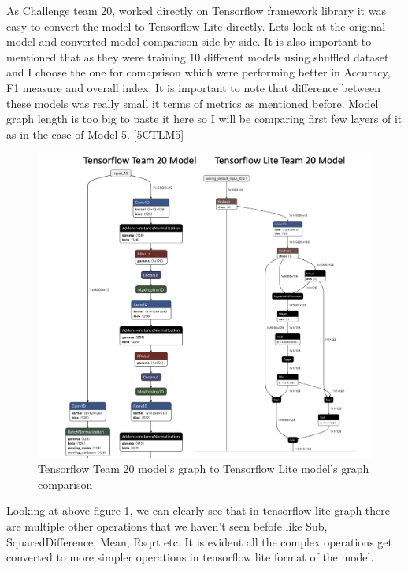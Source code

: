 As Challenge team 20, worked directly on Tensorflow framework library it was easy to convert the model to Tensorflow Lite directly. Lets look at the original model and converted model comparison side by side. It is also important to mentioned that as they were training 10 different models using shuffled dataset and I choose the one for comaprison which were performing better in Accuracy, F1 measure and overall index. It is important to note that difference between these models was really small it terms of metrics as mentioned before. Model graph length is too big to paste it here so I will be comparing first few layers of it as in the case of Model 5. \ref{5CTLM5} 


\begin{figure}[H]
\centering
\includegraphics[scale=0.7]{img/team20_conversion_comparison.png}
\caption{Tensorflow Team 20 model's graph to Tensorflow Lite model's graph comparison}
\label{team20_conversion_comparison}
\end{figure}

Looking at above figure \ref{team20_conversion_comparison}, we can clearly see that in tensorflow lite graph there are multiple other operations that we haven't seen befofe like Sub, SquaredDifference, Mean, Rsqrt etc. It is evident all the complex operations get converted to more simpler operations in tensorflow lite format of the model.  



